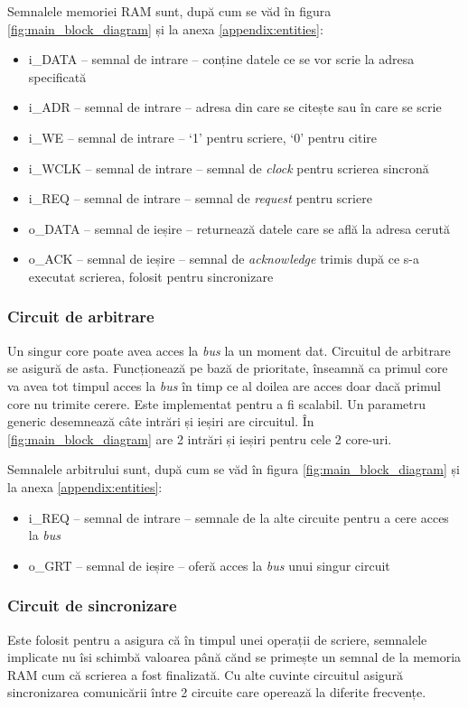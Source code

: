 \documentclass[../main.tex]{subfiles}
\begin{document}
Semnalele memoriei RAM sunt, după cum se văd în figura \ref{fig:main_block_diagram} și la anexa \ref{appendix:entities}:
\begin{itemize}
    \item i\_DATA -- semnal de intrare -- conține datele ce se vor scrie la adresa specificată
    \item i\_ADR -- semnal de intrare -- adresa din care se citește sau în care se scrie
    \item i\_WE -- semnal de intrare -- `1' pentru scriere, `0' pentru citire
    \item i\_WCLK -- semnal de intrare -- semnal de \emph{clock} pentru scrierea sincronă
    \item i\_REQ -- semnal de intrare -- semnal de \emph{request} pentru scriere
    \item o\_DATA -- semnal de ieșire -- returnează datele care se află la adresa cerută
    \item o\_ACK -- semnal de ieșire -- semnal de \emph{acknowledge} trimis după ce s-a executat scrierea, folosit pentru sincronizare
\end{itemize}

\subsubsection{Circuit de arbitrare}
Un singur core poate avea acces la \emph{bus} la un moment dat. Circuitul de arbitrare se asigură de asta. Funcționează pe
bază de prioritate, înseamnă ca primul core va avea tot timpul acces la \emph{bus} în timp ce al doilea are acces doar dacă
primul core nu trimite cerere. Este implementat pentru a fi scalabil. Un parametru generic desemnează câte intrări și ieșiri
are circuitul. În \ref{fig:main_block_diagram} are 2 intrări și ieșiri pentru cele 2 core-uri.

Semnalele arbitrului sunt, după cum se văd în figura \ref{fig:main_block_diagram} și la anexa \ref{appendix:entities}:
\begin{itemize}
    \item i\_REQ -- semnal de intrare -- semnale de la alte circuite pentru a cere acces la \emph{bus}
    \item o\_GRT -- semnal de ieșire -- oferă acces la \emph{bus} unui singur circuit
\end{itemize}

\subsubsection{Circuit de sincronizare}
Este folosit pentru a asigura că în timpul unei operații de scriere, semnalele implicate nu îsi schimbă valoarea până cănd
se primește un semnal de la memoria RAM cum că scrierea a fost finalizată. Cu alte cuvinte circuitul asigură sincronizarea
comunicării între 2 circuite care operează la diferite frecvențe.
\end{document}
